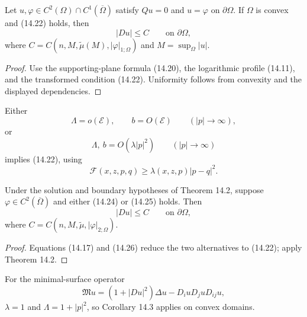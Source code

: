 \begin{theorem}
\label{gt14-boundary-gradient-14-2}
Let $u,\varphi\in C^2(\Omega)\cap C^1(\overline\Omega)$ satisfy $Qu=0$ and
$u=\varphi$ on $\partial\Omega$. If $\Omega$ is convex and (14.22) holds, then
\begin{equation}
|Du|\leq C\qquad\text{on }\partial\Omega,
\tag{14.23}
\end{equation}
where
$C=C(n,M,\widetilde\mu(M),|\varphi|_{1;\Omega})$ and
$M=\sup_\Omega|u|$.
\end{theorem}
\begin{proof}
\sketch Use the supporting-plane formula (14.20), the logarithmic profile
(14.11), and the transformed condition (14.22). Uniformity follows from
convexity and the displayed dependencies.
\end{proof}

Either
\begin{equation}
\Lambda=o(\mathcal E),\qquad b=O(\mathcal E)
\qquad(|p|\to\infty),
\tag{14.24}
\end{equation}
or
\begin{equation}
\Lambda,\ b=O(\lambda|p|^2)
\qquad(|p|\to\infty)
\tag{14.25}
\end{equation}
implies (14.22), using
\begin{equation}
\mathcal F(x,z,p,q)\geq\lambda(x,z,p)|p-q|^2.
\tag{14.26}
\end{equation}

\begin{corollary}
\label{gt14-boundary-gradient-14-3}
Under the solution and boundary hypotheses of Theorem 14.2, suppose
$\varphi\in C^2(\overline\Omega)$ and either (14.24) or (14.25) holds. Then
\begin{equation}
|Du|\leq C\qquad\text{on }\partial\Omega,
\tag{14.27}
\end{equation}
where $C=C(n,M,\widetilde\mu,|\varphi|_{2;\Omega})$.
\end{corollary}
\begin{proof}
\sketch Equations (14.17) and (14.26) reduce the two alternatives to (14.22);
apply Theorem 14.2.
\end{proof}

For the minimal-surface operator
\begin{equation}
\mathfrak Mu=(1+|Du|^2)\Delta u-D_iuD_juD_{ij}u,
\tag{14.28}
\end{equation}
$\lambda=1$ and $\Lambda=1+|p|^2$, so Corollary 14.3 applies on convex
domains.

